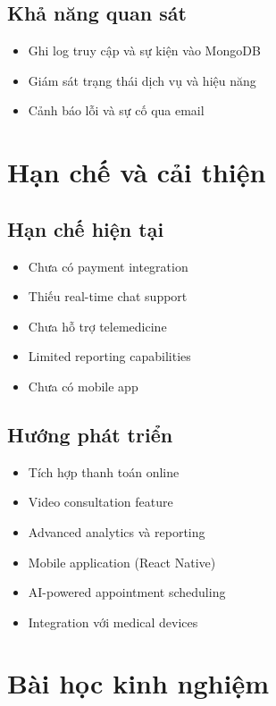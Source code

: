 \documentclass[12pt,a4paper]{report}
\begin{document}
    \subsection{Khả năng quan sát}
    \begin{itemize}
        \item Ghi log truy cập và sự kiện vào MongoDB
        \item Giám sát trạng thái dịch vụ và hiệu năng
        \item Cảnh báo lỗi và sự cố qua email
    \end{itemize}

    \section{Hạn chế và cải thiện}

    \subsection{Hạn chế hiện tại}
    \begin{itemize}
        \item Chưa có payment integration
        \item Thiếu real-time chat support
        \item Chưa hỗ trợ telemedicine
        \item Limited reporting capabilities
        \item Chưa có mobile app
    \end{itemize}

    \subsection{Hướng phát triển}
    \begin{itemize}
        \item Tích hợp thanh toán online
        \item Video consultation feature
        \item Advanced analytics và reporting
        \item Mobile application (React Native)
        \item AI-powered appointment scheduling
        \item Integration với medical devices
    \end{itemize}

    \section{Bài học kinh nghiệm}
\end{document}
